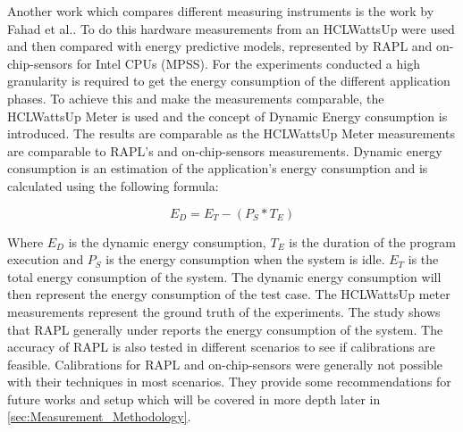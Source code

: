 Another work which compares different measuring instruments is the work by Fahad et al.\cite{fahad2019comparative}. To do this hardware measurements from an HCLWattsUp were used and then compared with energy predictive models, represented by RAPL and on-chip-sensors for Intel CPUs (MPSS). For the experiments conducted a high granularity is required to get the energy consumption of the different application phases. To achieve this and make the measurements comparable, the HCLWattsUp Meter is used and the concept of Dynamic Energy consumption is introduced. The results are comparable as the HCLWattsUp Meter measurements are comparable to RAPL's and on-chip-sensors measurements. Dynamic energy consumption is an estimation of the application's energy consumption and is calculated using the following formula:\cite{fahad2019comparative}

\begin{equation}\label{eq:dynamicEnergy}
    E_D = E_T - (P_S * T_E)
\end{equation}

Where $E_D$ is the dynamic energy consumption, $T_E$ is the duration of the program execution and $P_S$ is the energy consumption when the system is idle. $E_T$ is the total energy consumption of the system. The dynamic energy consumption will then represent the energy consumption of the test case. The HCLWattsUp meter measurements represent the ground truth of the experiments. The study shows that RAPL generally under reports the energy consumption of the system. The accuracy of RAPL is also tested in different scenarios to see if calibrations are feasible. Calibrations for RAPL and on-chip-sensors were generally not possible with their techniques in most scenarios. They provide some recommendations for future works and setup which will be covered in more depth later in \cref{sec:Measurement_Methodology}.